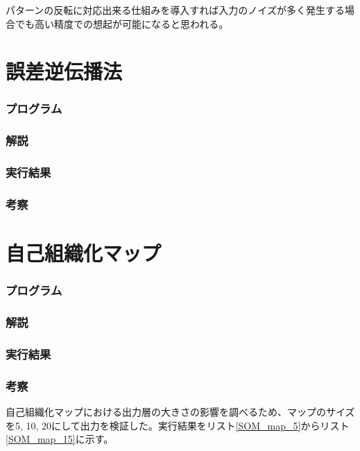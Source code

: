 \documentclass{jsarticle}
\begin{document}
パターンの反転に対応出来る仕組みを導入すれば入力のノイズが多く発生する場合でも高い精度での想起が可能になると思われる。

\part{誤差逆伝播法}
\section{プログラム}


\section{解説}


\section{実行結果}


\section{考察}


\part{自己組織化マップ}
\section{プログラム}


\section{解説}


\section{実行結果}


\section{考察}
自己組織化マップにおける出力層の大きさの影響を調べるため、マップのサイズを5, 10, 20にして出力を検証した。実行結果をリスト\ref{SOM_map_5}からリスト\ref{SOM_map_15}に示す。
\end{document}
